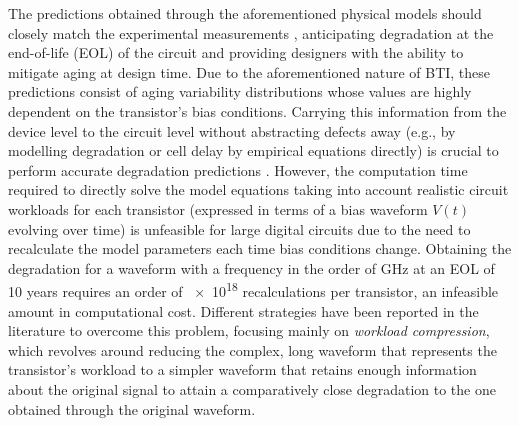 The predictions obtained through the aforementioned physical models should closely match the experimental measurements \cite{saraza-canflancaDeterminationTimeConstant2022}, anticipating degradation at the end-of-life (EOL) of the circuit and providing designers with the ability to mitigate aging at design time. Due to the aforementioned nature of BTI, these predictions consist of aging variability distributions whose values are highly dependent on the transistor's bias conditions. Carrying this information from the device level to the circuit level without abstracting defects away (e.g., by modelling degradation or cell delay by empirical equations directly) is crucial to perform accurate degradation predictions \cite{vansantenModelingMitigatingTimeDependent2019}. However, the computation time required to directly solve the model equations taking into account realistic circuit workloads for each transistor (expressed in terms of a bias waveform $V(t)$ evolving over time) is unfeasible for large digital circuits \cite{vansantenDesigningGuardbandsInstantaneous2016} due to the need to recalculate the model parameters each time bias conditions change. Obtaining the degradation for a waveform with a frequency in the order of GHz at an EOL of 10 years requires an order of \num{e18} recalculations per transistor, an infeasible amount in computational cost. Different strategies have been reported in the literature to overcome this problem, focusing mainly on \textit{workload compression}, which revolves around reducing the complex, long waveform that represents the transistor's workload to a simpler waveform that retains enough information about the original signal to attain a comparatively close degradation to the one obtained through the original waveform. 
 

